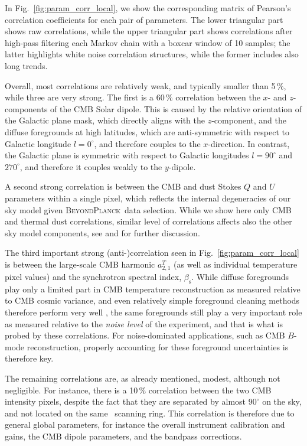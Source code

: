 \documentclass[twocolumn]{aa}
\newcommand{\BP}{\textsc{BeyondPlanck}}
\begin{document}
In Fig.~\ref{fig:param_corr_local}, we show the corresponding matrix of
Pearson's correlation coefficients for each pair of parameters. The
lower triangular part shows raw correlations, while the upper triangular part shows
correlations after high-pass filtering each Markov chain with a boxcar
window of 10 samples; the latter highlights white noise correlation
structures, while the former includes also long trends.

Overall, most correlations are relatively weak, and typically smaller
than 5\,\%, while three are very strong. The first is a 60\,\%
correlation between the $x$- and $z$-components of the CMB Solar
dipole. This is caused by the relative orientation of the Galactic
plane mask, which directly aligns with the $z$-component, and the
diffuse foregrounds at high latitudes, which are anti-symmetric with
respect to Galactic longitude $l=0^{\circ}$, and therefore couples to
the $x$-direction. In contrast, the Galactic plane is symmetric with
respect to Galactic longitudes $l=90^{\circ}$ and $270^{\circ}$, and
therefore it couples weakly to the $y$-dipole.

A second strong correlation is between the CMB and dust Stokes $Q$ and $U$ parameters within a single pixel, which reflects the internal degeneracies of our sky model given \BP\ data selection. While we show here only CMB and thermal dust correlations, similar level of correlations affects also the other sky model components, see \cite{bp10} and \cite{bp13} for further discussion. 
  
The third important strong (anti-)correlation seen in
Fig.~\ref{fig:param_corr_local} is between the large-scale CMB
harmonic $a_{2,1}^T$ (as well as individual temperature pixel values)
and the synchrotron spectral index, $\beta_{\mathrm{s}}$. While
diffuse foregrounds play only a limited part in CMB temperature
reconstruction as measured relative to CMB cosmic variance, and even
relatively simple foreground cleaning methods therefore perform very
well \citep[e.g.,][]{bennett2012,planck2016-l04}, the same foregrounds
still play a very important role as measured relative to the \emph{noise
level} of the experiment, and that is what is probed by these
correlations. For noise-dominated applications, such as CMB $B$-mode
reconstruction, properly accounting for these foreground uncertainties
is therefore key.

The remaining correlations are, as already mentioned, modest, although
not negligible. For instance, there is a 10\,\% correlation between
the two CMB intensity pixels, despite the fact that they are separated
by almost $90^{\circ}$ on the sky, and not located on the same
\Planck\ scanning ring. This correlation is therefore due to general
global parameters, for instance the overall instrument calibration and
gains, the CMB dipole parameters, and the bandpass corrections.
\end{document}
